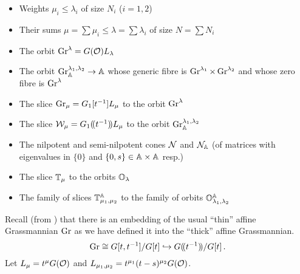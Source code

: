 \documentclass{article}
\begin{document}
\begin{itemize}
    \item Weights $\mu_i\le\lambda_i$ of size $N_i$ ($i=1,2$) 
    \item Their sums $\mu = \sum \mu_i \le \lambda = \sum\lambda_i$ of size $N = \sum N_i$
    \item The orbit $\Gr^\lambda = G(\cO) L_\lambda$ 
    \item The orbit $\Gr_\AA^{\lambda_1,\lambda_2}\to\AA$ whose generic fibre is $\Gr^{\lambda_1} \times \Gr^{\lambda_2}$ and whose zero fibre is $\Gr^{\lambda}$ 
    \item The slice $\Gr_\mu = G_1[t^{-1}]L_\mu$ to the orbit $\Gr^\lambda$
    \item The slice $\cW_\mu = G_1\xT[t^{-1}] L_\mu$ to the orbit $\Gr_\AA^{\lambda_1,\lambda_2}$ %
    \item The nilpotent and semi-nilpotent cones $\cN$ and $\cN_\AA$ (of matrices with eigenvalues in $\{0\}$ and $\{0,s\} \in \AA\times\AA$ resp.) 
    \item The slice $\TT_\mu$ to the orbits $\OO_\lambda$ 
    \item The family of slices $\TT_{\mu_1,\mu_2}^{\AA}$ to the family of orbits $\OO^{\AA}_{\lambda_1,\lambda_2}$ 
\end{itemize}

% 

Recall (from \cite{kamnitzer2014yangians}) that there is an embedding of the usual ``thin'' affine Grassmannian $\Gr $ as we have defined it into the ``thick'' affine Grassmannian. 
\[
\Gr \cong G[t,t^{-1}]/G[t]\hookrightarrow G\xT[t^{-1}]/G[t]\,.
\]
Let $L_\mu = t^\mu G(\cO)$ and $L_{\mu_1, \mu_2} = t^{\mu_1} (t-s)^{\mu_2} G(\cO)$.  %
\end{document}
